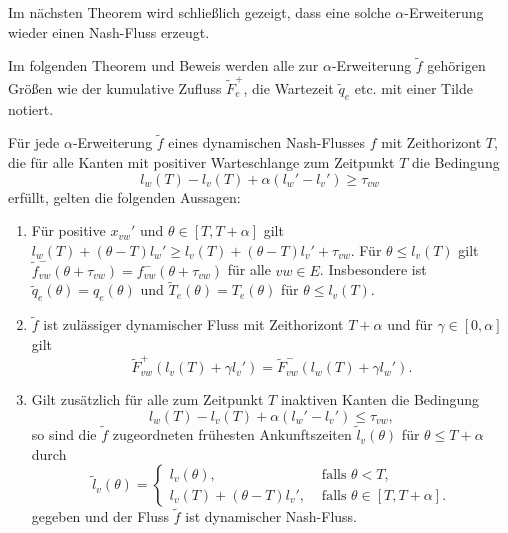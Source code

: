 Im nächsten Theorem wird schließlich gezeigt, dass eine solche $\alpha$-Erweiterung wieder einen Nash-Fluss erzeugt.

\begin{notation}
	Im folgenden Theorem und Beweis werden alle zur $\alpha$-Erweiterung $\tilde{f}$ gehörigen Größen wie der kumulative Zufluss $\tilde{F}_e^+$, die Wartezeit $\tilde{q}_e$ etc. mit einer Tilde notiert.
\end{notation}

\begin{theorem}\label{thm-alpha-extension-is-nash-flow}
	Für jede $\alpha$-Erweiterung $\tilde{f}$ eines dynamischen Nash-Flusses $f$ mit Zeithorizont $T$, die für alle Kanten mit positiver Warteschlange zum Zeitpunkt $T$ die Bedingung
	\[ l_w(T) - l_v(T) + \alpha(l_w' - l_v') \geq \tau_{vw} \]
	erfüllt, gelten die folgenden Aussagen:
	\begin{enumerate}[label=(\roman*)]
		\item Für positive $x_{vw}'$ und $\theta\in[T, T+\alpha]$ gilt $l_w(T) + (\theta - T)l_w' \geq l_v(T) + (\theta - T)l_v' + \tau_{vw}$.
		Für $\theta \leq l_v(T)$ gilt $\tilde{f}^-_{vw}(\theta + \tau_{vw})=f^-_{vw}(\theta + \tau_{vw})$ für alle $vw\in E$.
		Insbesondere ist $\tilde{q}_e(\theta) = q_e(\theta)$ und $\tilde{T}_e(\theta) = T_e(\theta)$ für $\theta \leq l_v(T)$.
		\item $\tilde{f}$ ist zulässiger dynamischer Fluss mit Zeithorizont $T+\alpha$ und für $\gamma \in [0, \alpha]$ gilt
		\[ \tilde{F}_{vw}^+(l_v(T) + \gamma l_v') = \tilde{F}_{vw}^-(l_w(T) + \gamma l_w'). \]
		\item Gilt zusätzlich für alle zum Zeitpunkt $T$ inaktiven Kanten die Bedingung \[
		l_w(T) - l_v(T) + \alpha(l_w' -l_v') \leq \tau_{vw},
		\]
		so sind die $\tilde{f}$ zugeordneten frühesten Ankunftszeiten $\tilde{l}_v(\theta)$ für $\theta \leq T+\alpha$ durch
		\[ \tilde{l}_v(\theta) = \begin{cases}
		l_v(\theta), & \text{ falls $\theta < T$,} \\
		l_v(T) + (\theta - T) l_v', & \text{ falls $\theta \in [T, T+\alpha]$.}
		\end{cases}\]
		gegeben und der Fluss $\tilde{f}$ ist dynamischer Nash-Fluss.
	\end{enumerate}
\end{theorem}
